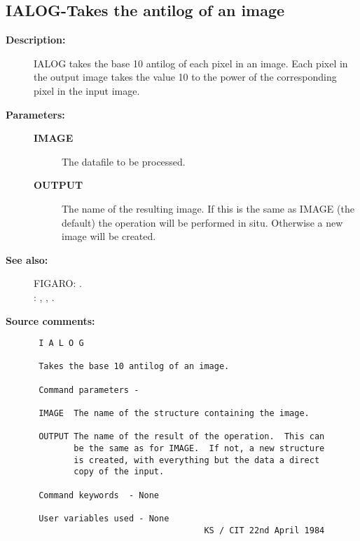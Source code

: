 \subsection{IALOG-\label{IALOG}Takes the antilog of an image}
\begin{description}

\item [{\bf Description:}]
 IALOG takes the base 10 antilog of each pixel in an image.
 Each pixel in the output image takes the value 10 to the power
 of the corresponding pixel in the input image.

\item [{\bf Parameters:}]
\begin{description}
\item [{\bf IMAGE}]
 The datafile to be processed.
\item [{\bf OUTPUT}]
 The name of the resulting image.  If this is the
 same as IMAGE (the default) the operation will be
 performed in situ.  Otherwise a new image will be
 created.
\end{description}

\item [{\bf See also:}]
FIGARO: .\\
: , , .\\

\item [{\bf Source comments:}]
\begin{verbatim}
 I A L O G

 Takes the base 10 antilog of an image.

 Command parameters -

 IMAGE  The name of the structure containing the image.

 OUTPUT The name of the result of the operation.  This can
        be the same as for IMAGE.  If not, a new structure
        is created, with everything but the data a direct
        copy of the input.

 Command keywords  - None

 User variables used - None
                                  KS / CIT 22nd April 1984
\end{verbatim}
\end{description}
